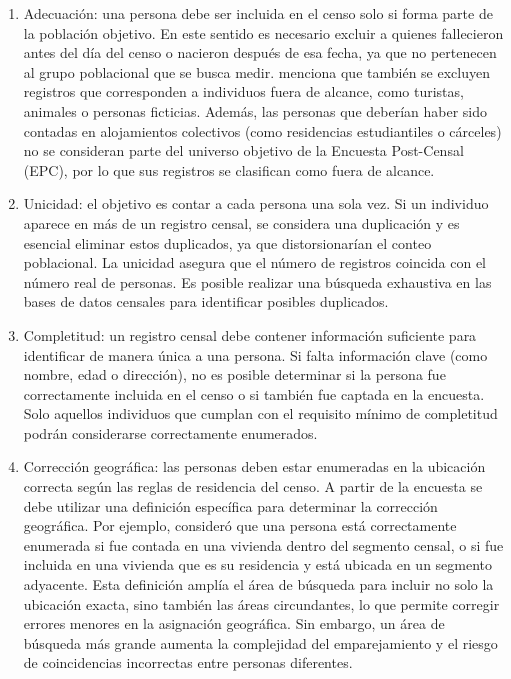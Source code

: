 \documentclass[
  12pt,
]{book}
\providecommand{\tightlist}{%
  \setlength{\itemsep}{0pt}\setlength{\parskip}{0pt}}
\begin{document}
\begin{enumerate}
\def\labelenumi{\arabic{enumi}.}
\tightlist
\item
  Adecuación: una persona debe ser incluida en el censo solo si forma parte de la población objetivo. En este sentido es necesario excluir a quienes fallecieron antes del día del censo o nacieron después de esa fecha, ya que no pertenecen al grupo poblacional que se busca medir. \citet{USCensusBureau_2022} menciona que también se excluyen registros que corresponden a individuos fuera de alcance, como turistas, animales o personas ficticias. Además, las personas que deberían haber sido contadas en alojamientos colectivos (como residencias estudiantiles o cárceles) no se consideran parte del universo objetivo de la Encuesta Post-Censal (EPC), por lo que sus registros se clasifican como fuera de alcance.
\item
  Unicidad: el objetivo es contar a cada persona una sola vez. Si un individuo aparece en más de un registro censal, se considera una duplicación y es esencial eliminar estos duplicados, ya que distorsionarían el conteo poblacional. La unicidad asegura que el número de registros coincida con el número real de personas. Es posible realizar una búsqueda exhaustiva en las bases de datos censales para identificar posibles duplicados.
\item
  Completitud: un registro censal debe contener información suficiente para identificar de manera única a una persona. Si falta información clave (como nombre, edad o dirección), no es posible determinar si la persona fue correctamente incluida en el censo o si también fue captada en la encuesta. Solo aquellos individuos que cumplan con el requisito mínimo de completitud podrán considerarse correctamente enumerados.
\item
  Corrección geográfica: las personas deben estar enumeradas en la ubicación correcta según las reglas de residencia del censo. A partir de la encuesta se debe utilizar una definición específica para determinar la corrección geográfica. Por ejemplo, \citet{USCensusBureau_2022} consideró que una persona está correctamente enumerada si fue contada en una vivienda dentro del segmento censal, o si fue incluida en una vivienda que es su residencia y está ubicada en un segmento adyacente. Esta definición amplía el área de búsqueda para incluir no solo la ubicación exacta, sino también las áreas circundantes, lo que permite corregir errores menores en la asignación geográfica. Sin embargo, un área de búsqueda más grande aumenta la complejidad del emparejamiento y el riesgo de coincidencias incorrectas entre personas diferentes.
\end{enumerate}
\end{document}
